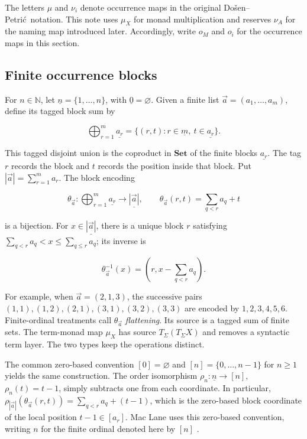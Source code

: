 \documentclass[11pt]{article}
\newcommand{\finord}[1]{\underline{#1}}
\newcommand{\DP}{Do\v{s}en--Petri\'{c}}
\theoremstyle{definition}
\begin{document}
The letters \(\mu\) and \(\nu_i\) denote occurrence maps in the original
\DP\ notation. This note uses \(\mu_X\) for monad multiplication and reserves
\(\nu_A\) for the naming map introduced later. Accordingly, write \(o_M\) and
\(o_i\) for the occurrence maps in this section.

\subsection{Finite occurrence blocks}

For \(n\in\mathbb N\), let
\(\finord n=\{1,\ldots,n\}\), with
\(\finord0=\varnothing\). Given a finite list
\(\vec a=(a_1,\ldots,a_m)\), define its tagged block sum by

\[
\bigoplus_{r=1}^{m}\finord{a_r}
=\{(r,t):r\in\finord m,\ t\in\finord{a_r}\}.
\]

This tagged disjoint union is the coproduct in \(\mathbf{Set}\) of the finite
blocks \(\finord{a_r}\).
The tag \(r\) records the block and \(t\) records the position inside that
block. Put \(|\vec a|=\sum_{r=1}^{m}a_r\). The block encoding

\[
\theta_{\vec a}:
\bigoplus_{r=1}^{m}\finord{a_r}
\longrightarrow \finord{|\vec a|},
\qquad
\theta_{\vec a}(r,t)=\sum_{q<r}a_q+t
\]

is a bijection. For \(x\in\finord{|\vec a|}\), there is a unique block
\(r\) satisfying
\(\sum_{q<r}a_q<x\leq\sum_{q\leq r}a_q\); its inverse is

\[
\theta_{\vec a}^{-1}(x)
=\left(r,x-\sum_{q<r}a_q\right).
\]

For example, when \(\vec a=(2,1,3)\), the successive pairs
\((1,1),(1,2),(2,1),(3,1),(3,2),(3,3)\) are encoded by
\(1,2,3,4,5,6\). Finite-ordinal treatments call \(\theta_{\vec a}\)
\emph{flattening}. Its source is a tagged sum of finite sets. The term-monad
map \(\mu_X\) has source \(T_\Sigma(T_\Sigma X)\) and removes a syntactic term
layer. The two types keep the operations distinct.

The common zero-based convention
\([0]=\varnothing\) and \([n]=\{0,\ldots,n-1\}\) for \(n\geq 1\)
yields the same construction. The order isomorphism
\(\rho_n:\finord n\to[n]\), \(\rho_n(t)=t-1\), simply subtracts one from
each coordinate. In particular,
\(\rho_{|\vec a|}(\theta_{\vec a}(r,t))
=\sum_{q<r}a_q+(t-1)\), which is the zero-based block coordinate of the
local position \(t-1\in[a_r]\). Mac Lane uses this zero-based convention,
writing \(n\) for the finite ordinal denoted here by \([n]\)
\cite[\S VII.5]{MacLane}.
\end{document}
